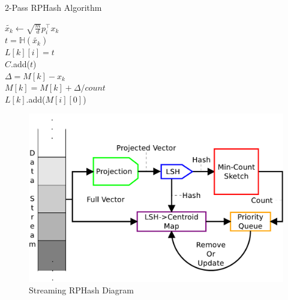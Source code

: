 \begin{algorithm}
\caption{ 2-Pass \textsf{RPHash} Algorithm\label{2passrp}}

{
  {
    $\tilde{x_k}\leftarrow \sqrt{\frac{m}{d}}p_i^{\intercal}x_k $\\
    $t = \mathbb{H}(\tilde{x_k})$\\
    $L[k][i] = t$\\
    $C$.add($t$)\\
  }
}
{
  {
    {
	$\Delta = M[k]-x_k$\\
	$M[k]=M[k]+\Delta/count$\\
	$L[k]$.add($M[i][0]$)\\
    }
  }
}
\end{algorithm}

\begin{figure}
    \centerline{\includegraphics[width=.8\textwidth]{figs/rphashoverview}}
    \caption{Streaming \textsf{RPHash} Diagram}\label{rphash}
\end{figure}

